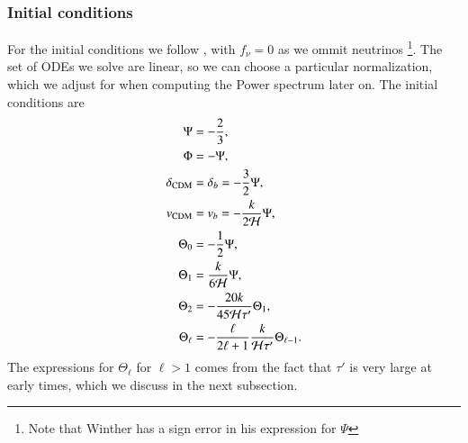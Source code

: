 \subsubsection{Initial conditions} \label{sssec:M3:theory:initial_conditions}
For the initial conditions we follow \cite{winther}, with $f_\nu=0$ as we ommit neutrinos \footnote{Note that Winther has a sign error in his expression for $\Psi$}. The set of ODEs we solve are linear, so we can choose a particular normalization, which we adjust for when computing the Power spectrum later on. The initial conditions are      
\begin{subequations} \label{eq:M3:theory:pert_ODE_IC}
    \begin{align}
        \Psi &= -\frac{2}{3}, \label{eq:M3:implementations:pert_ODE_IC_Psi} \\
        \Phi &= - \Psi, \label{eq:M3:implementations:pert_ODE_IC_Phi} \\
        \delta_\mathrm{CDM} &= \delta_b = -\frac{3}{2}\Psi, \label{eq:M3:implementations:pert_ODE_IC_delta_cdm} \\
        v_\mathrm{CDM} &= v_b = -\frac{k}{2\mathcal{H}} \Psi, \label{eq:M3:implementations:pert_ODE_IC_v_cdm} \\
        \Theta_0 &= -\frac{1}{2}\Psi, \label{eq:M3:implementations:pert_ODE_IC_Theta0} \\
        \Theta_1 &= \frac{k}{6\mathcal{H}}\Psi, \label{eq:M3:implementations:pert_ODE_IC_Theta1} \\
        \Theta_2 &= - \frac{20k}{45\mathcal{H}\tau'}\Theta_1, \label{eq:M3:implementations:pert_ODE_IC_Theta2} \\
        \Theta_\ell &= - \frac{\ell}{2\ell+1} \frac{k}{\mathcal{H}\tau'}\Theta_{\ell-1}. 
    \end{align}
\end{subequations}
The expressions for $\Theta_\ell$ for $\ell>1$ comes from the fact that $\tau'$ is very large at early times, which we discuss in the next subsection.



